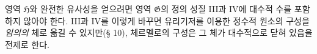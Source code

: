 
영역 $\mathfrak H$와 완전한 유사성을 얻으려면 영역 $\mathfrak G$의 정의 성질 III과 IV에 대수적 수를 포함하지 않아야 한다. III과 IV를 이렇게 바꾸면 유리기저를 이용한 정수적 원소의 구성을 \emph{임의의} 체로 옮길 수 있지만(§ 10), 체르멜로의 구성은 그 체가 대수적으로 닫혀 있음을 전제로 한다.
